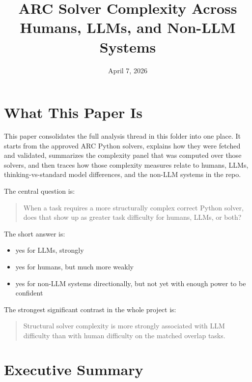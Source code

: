 \documentclass[11pt]{article}
\title{ARC Solver Complexity Across Humans, LLMs, and Non-LLM Systems}
\author{}
\date{April 7, 2026}
\begin{document}
\maketitle

\section*{What This Paper Is}

This paper consolidates the full analysis thread in this folder into one place. It starts from the approved ARC Python solvers, explains how they were fetched and validated, summarizes the complexity panel that was computed over those solvers, and then traces how those complexity measures relate to humans, LLMs, thinking-vs-standard model differences, and the non-LLM systems in the repo.

The central question is:

\begin{quote}
When a task requires a more structurally complex correct Python solver, does that show up as greater task difficulty for humans, LLMs, or both?
\end{quote}

The short answer is:

\begin{itemize}
  \item yes for LLMs, strongly
  \item yes for humans, but much more weakly
  \item yes for non-LLM systems directionally, but not yet with enough power to be confident
\end{itemize}

The strongest significant contrast in the whole project is:

\begin{quote}
Structural solver complexity is more strongly associated with LLM difficulty than with human difficulty on the matched overlap tasks.
\end{quote}

\section*{Executive Summary}
\end{document}
